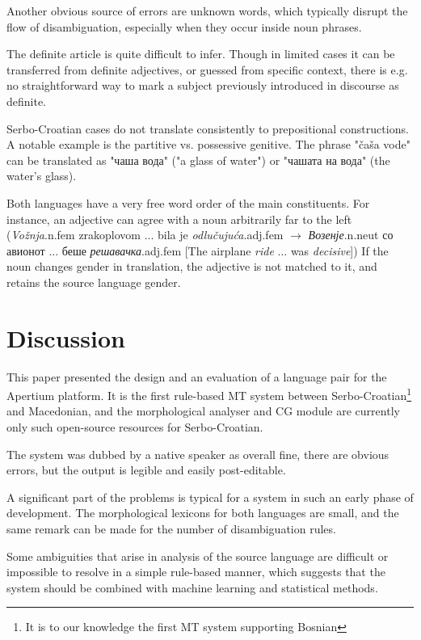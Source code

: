 \documentclass{book}
\begin{document}
Another obvious source of errors are unknown words, which typically disrupt 
the flow of disambiguation, especially when they occur inside noun phrases.

The definite article is quite difficult to infer. Though in limited
cases it can be transferred from definite adjectives, or guessed from
specific context, there is e.g. no straightforward way to mark a subject previously
introduced in discourse as definite.

Serbo-Croatian cases do not translate consistently to prepositional constructions.
A notable example is the partitive vs. possessive genitive. The phrase "čaša vode"
can be translated as "чаша вода" ("a glass of water") or "чашата на вода" 
(the water's glass).

Both languages have a very free word order of the main constituents. For instance, an 
adjective can agree with a noun arbitrarily far to the left
(\emph{Vožnja}{\sc.n.fem} zrakoplovom ... bila je \emph{odlučujuća}{\sc.adj.fem} $\rightarrow$ \emph{Возенје}{\sc.n.neut} со авионот ... беше \emph{решавачка}{\sc.adj.fem}  [The airplane \emph{ride} ... was \emph{decisive}])
If the noun 
changes gender in translation, the adjective is not matched to it, and retains
the source language gender.

\section{Discussion}
This paper presented the design and an evaluation of a language pair for the Apertium platform.
It is the first rule-based MT system between Serbo-Croatian\footnote{It is to our knowledge the first 
MT system supporting Bosnian} and Macedonian, and the morphological
analyser and CG module are currently only such open-source resources for Serbo-Croatian.

The system was dubbed by a native speaker as overall fine, there are obvious errors, but the output is legible and easily post-editable. 

A significant part of the problems is typical for a system in such an early phase of 
development. The morphological lexicons for both languages are small, and 
the same remark can be made for the number of disambiguation rules. 

Some ambiguities that arise in analysis of the source language are 
difficult or impossible to resolve in a simple rule-based manner, which suggests that 
the system should be combined with machine learning and statistical methods.
\end{document}
